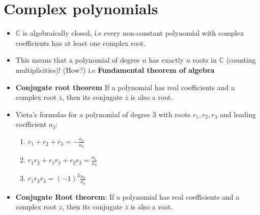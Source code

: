 \documentclass[12pt]{article}
\begin{document}
\section{Complex polynomials}
\begin{itemize}
    \item $\mathbb{C}$ is algebraically closed, i.e every non-constant polynomial with complex coefficients has at least one complex root.
    \item This means that a polynomial of degree $n$ has exactly $n$ roots in $\mathbb{C}$ (counting multiplicities)! (How?) i.e \textbf{Fundamental theorem of algebra}
    \item \textbf{Conjugate root theorem} If a polynomial has real coefficients and a complex root $z$, then its conjugate $\overline{z}$ is also a root.
    \item Vieta's formulas for a polynomial of degree $3$ with roots $r_1, r_2, r_3$ and leading coefficient $a_3$:
    \begin{enumerate}
        \item $r_1 + r_2 + r_3 = -\frac{a_2}{a_3}$
        \item $r_1 r_2 + r_1 r_3 + r_2 r_3 = \frac{a_1}{a_3}$
        \item $r_1 r_2 r_3 = (-1)^3 \frac{a_0}{a_3}$
    \end{enumerate}
    \item \textbf{Conjugate Root theorem}: If a polynomial has real coefficients and a complex root $z$, then its conjugate $\overline{z}$ is also a root.
\end{itemize}
\end{document}
